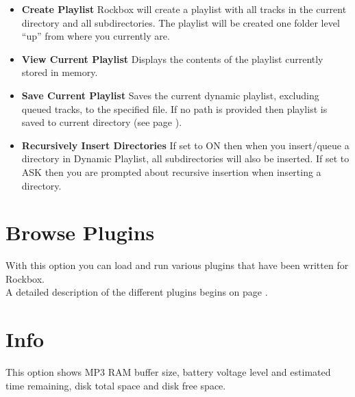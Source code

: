\begin{itemize}
\item \textbf{Create Playlist}
  Rockbox will create a playlist with all tracks in the current directory and all subdirectories. The playlist will be created one folder level ``up'' from where you currently are.
  
\item \textbf{View Current Playlist}
  Displays the contents of the playlist currently stored in memory.
  
\item \textbf{Save Current Playlist}
  Saves the current dynamic playlist, excluding queued tracks, to the specified file. If no path is provided then playlist is saved to current directory (see page \pageref{ref:Playlistsubmenu}).
  
\item \textbf{Recursively Insert Directories}
  If set to ON then when you insert/queue a directory in Dynamic Playlist, all subdirectories will also be inserted. If set to ASK then you are prompted about recursive insertion when inserting a directory.
\end{itemize}

\section{Browse Plugins}
With this option you can load and run various plugins that have been written for Rockbox.\\

A detailed description of the different plugins begins on page \pageref{ref:plugins}.

\section{\label{ref:Info}Info}
This option shows MP3 RAM buffer size, battery voltage level and estimated time remaining, disk total space and disk free space.

